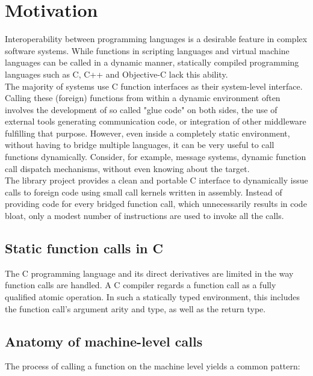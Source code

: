 \newpage
\section{Motivation}

Interoperability between programming languages is a desirable feature 
in complex software systems. While functions in scripting languages and virtual machine
languages can be called in a dynamic manner, statically compiled programming
languages such as C, C++ and Objective-C lack this ability.\\
The majority of systems use C function interfaces as their system-level 
interface. Calling these (foreign) functions from within a dynamic environment 
often involves the development of so called "glue code" on both sides,
the use of external tools generating communication code, or integration
of other middleware fulfilling that purpose. However, even inside a completely
static environment, without having to bridge multiple languages, it
can be very useful to call functions dynamically. Consider, for example, message 
systems, dynamic function call dispatch mechanisms, without even knowing about the 
target.\\

The  library project provides a clean and portable C interface
to dynamically issue calls to foreign code using small call kernels written in
assembly. Instead of providing code for every bridged function call, which
unnecessarily results in code bloat, only a modest number of instructions are used
to invoke all the calls.\\

\subsection{Static function calls in C}

The C programming language and its direct derivatives are limited in the way 
function calls are handled. A C compiler regards a function call as a
fully qualified atomic operation. In such a statically typed environment, this 
includes the function call's argument arity and type, as well as the
return type.\\


\subsection{Anatomy of machine-level calls}

The process of calling a function on the machine level yields a common pattern:

